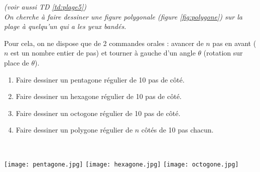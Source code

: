 \begin{td}\label{td:tortue}
\em
(voir aussi TD \ref{td:plage5})\\
On cherche à faire dessiner une figure polygonale (figure \ref{fig:polygone}) 
sur la plage à quelqu'un qui a les yeux bandés.

\noindent\begin{minipage}[t]{14cm}
Pour cela, on ne dispose que de 2 commandes orales :
avancer de $n$ pas en avant ($n$ est un nombre entier de pas) et 
tourner à gauche d'un angle $\theta$ (rotation sur place de $\theta$).
\begin{enumerate}
\item Faire dessiner un pentagone régulier de 10 pas de côté.
\item Faire dessiner un hexagone régulier de 10 pas de côté.
\item Faire dessiner un octogone régulier de 10 pas de côté.
\item Faire dessiner un polygone régulier de $n$ côtés de 10 pas chacun.
\end{enumerate}
\end{minipage}
\hfill
\begin{minipage}[t]{8cm}
\begin{fig}\label{fig:polygone}
\mbox{}\\
\centerline{
\texttt{[image: pentagone.jpg]}
\hfill
\texttt{[image: hexagone.jpg]}
\hfill
\texttt{[image: octogone.jpg]}
}
\end{fig}
\end{minipage}

\end{td}

